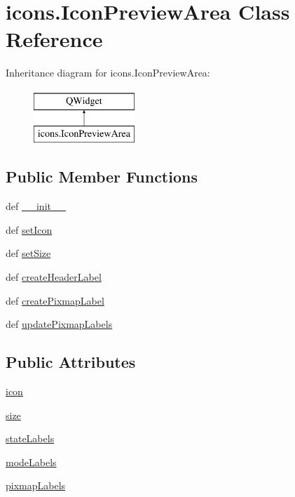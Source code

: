 \hypertarget{classicons_1_1IconPreviewArea}{}\section{icons.\+Icon\+Preview\+Area Class Reference}
\label{classicons_1_1IconPreviewArea}
Inheritance diagram for icons.\+Icon\+Preview\+Area\+:\begin{figure}[H]
\begin{center}
\leavevmode
\includegraphics[height=2.000000cm]{classicons_1_1IconPreviewArea}
\end{center}
\end{figure}
\subsection*{Public Member Functions}
\begin{DoxyCompactItemize}
\item 
def \hyperlink{classicons_1_1IconPreviewArea_a7afc6b510dca32f0565856cede675230}{\+\_\+\+\_\+init\+\_\+\+\_\+}
\item 
def \hyperlink{classicons_1_1IconPreviewArea_a0f0aa3ed1f9bb9f000843514e3706371}{set\+Icon}
\item 
def \hyperlink{classicons_1_1IconPreviewArea_a259ce424d1553cc4f432b5fd675213a1}{set\+Size}
\item 
def \hyperlink{classicons_1_1IconPreviewArea_a91173a00d269689836b9ae75645e231e}{create\+Header\+Label}
\item 
def \hyperlink{classicons_1_1IconPreviewArea_af7e6f8718010bcc948652349e77a91d6}{create\+Pixmap\+Label}
\item 
def \hyperlink{classicons_1_1IconPreviewArea_a34abc184b91c794e35b69cde9e28a986}{update\+Pixmap\+Labels}
\end{DoxyCompactItemize}
\subsection*{Public Attributes}
\begin{DoxyCompactItemize}
\item 
\hyperlink{classicons_1_1IconPreviewArea_a019d93b26d280f18bfb9d385865cdd31}{icon}
\item 
\hyperlink{classicons_1_1IconPreviewArea_ab96805e2da745cbbdfe957789f8ac7b7}{size}
\item 
\hyperlink{classicons_1_1IconPreviewArea_a48f15b24ebb61bd9ced171d72504494a}{state\+Labels}
\item 
\hyperlink{classicons_1_1IconPreviewArea_adc413ed3651e12898b6167773e6bbace}{mode\+Labels}
\item 
\hyperlink{classicons_1_1IconPreviewArea_a6bb7fc69fd129436fce30183bbc35233}{pixmap\+Labels}
\end{DoxyCompactItemize}


